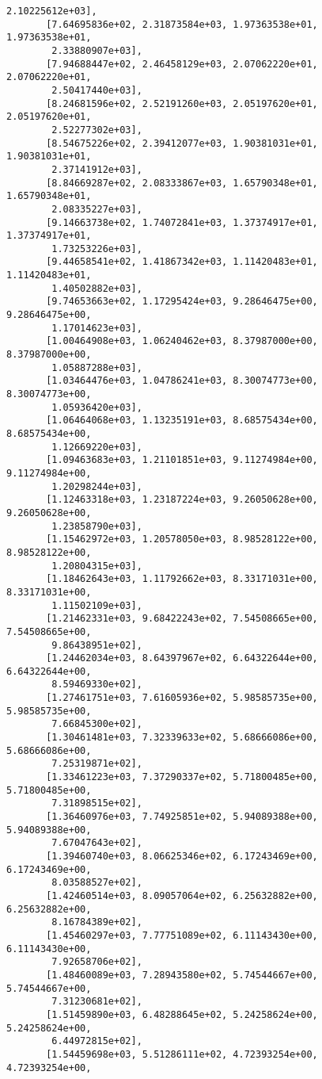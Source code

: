 \documentclass[11pt]{article}
\begin{document}
\begin{tcolorbox}[breakable, size=fbox, boxrule=.5pt, pad at break*=1mm, opacityfill=0]
\begin{Verbatim}[commandchars=\\\{\}]
        2.10225612e+03],
       [7.64695836e+02, 2.31873584e+03, 1.97363538e+01, 1.97363538e+01,
        2.33880907e+03],
       [7.94688447e+02, 2.46458129e+03, 2.07062220e+01, 2.07062220e+01,
        2.50417440e+03],
       [8.24681596e+02, 2.52191260e+03, 2.05197620e+01, 2.05197620e+01,
        2.52277302e+03],
       [8.54675226e+02, 2.39412077e+03, 1.90381031e+01, 1.90381031e+01,
        2.37141912e+03],
       [8.84669287e+02, 2.08333867e+03, 1.65790348e+01, 1.65790348e+01,
        2.08335227e+03],
       [9.14663738e+02, 1.74072841e+03, 1.37374917e+01, 1.37374917e+01,
        1.73253226e+03],
       [9.44658541e+02, 1.41867342e+03, 1.11420483e+01, 1.11420483e+01,
        1.40502882e+03],
       [9.74653663e+02, 1.17295424e+03, 9.28646475e+00, 9.28646475e+00,
        1.17014623e+03],
       [1.00464908e+03, 1.06240462e+03, 8.37987000e+00, 8.37987000e+00,
        1.05887288e+03],
       [1.03464476e+03, 1.04786241e+03, 8.30074773e+00, 8.30074773e+00,
        1.05936420e+03],
       [1.06464068e+03, 1.13235191e+03, 8.68575434e+00, 8.68575434e+00,
        1.12669220e+03],
       [1.09463683e+03, 1.21101851e+03, 9.11274984e+00, 9.11274984e+00,
        1.20298244e+03],
       [1.12463318e+03, 1.23187224e+03, 9.26050628e+00, 9.26050628e+00,
        1.23858790e+03],
       [1.15462972e+03, 1.20578050e+03, 8.98528122e+00, 8.98528122e+00,
        1.20804315e+03],
       [1.18462643e+03, 1.11792662e+03, 8.33171031e+00, 8.33171031e+00,
        1.11502109e+03],
       [1.21462331e+03, 9.68422243e+02, 7.54508665e+00, 7.54508665e+00,
        9.86438951e+02],
       [1.24462034e+03, 8.64397967e+02, 6.64322644e+00, 6.64322644e+00,
        8.59469330e+02],
       [1.27461751e+03, 7.61605936e+02, 5.98585735e+00, 5.98585735e+00,
        7.66845300e+02],
       [1.30461481e+03, 7.32339633e+02, 5.68666086e+00, 5.68666086e+00,
        7.25319871e+02],
       [1.33461223e+03, 7.37290337e+02, 5.71800485e+00, 5.71800485e+00,
        7.31898515e+02],
       [1.36460976e+03, 7.74925851e+02, 5.94089388e+00, 5.94089388e+00,
        7.67047643e+02],
       [1.39460740e+03, 8.06625346e+02, 6.17243469e+00, 6.17243469e+00,
        8.03588527e+02],
       [1.42460514e+03, 8.09057064e+02, 6.25632882e+00, 6.25632882e+00,
        8.16784389e+02],
       [1.45460297e+03, 7.77751089e+02, 6.11143430e+00, 6.11143430e+00,
        7.92658706e+02],
       [1.48460089e+03, 7.28943580e+02, 5.74544667e+00, 5.74544667e+00,
        7.31230681e+02],
       [1.51459890e+03, 6.48288645e+02, 5.24258624e+00, 5.24258624e+00,
        6.44972815e+02],
       [1.54459698e+03, 5.51286111e+02, 4.72393254e+00, 4.72393254e+00,

\end{Verbatim}
\end{tcolorbox}
\end{document}
